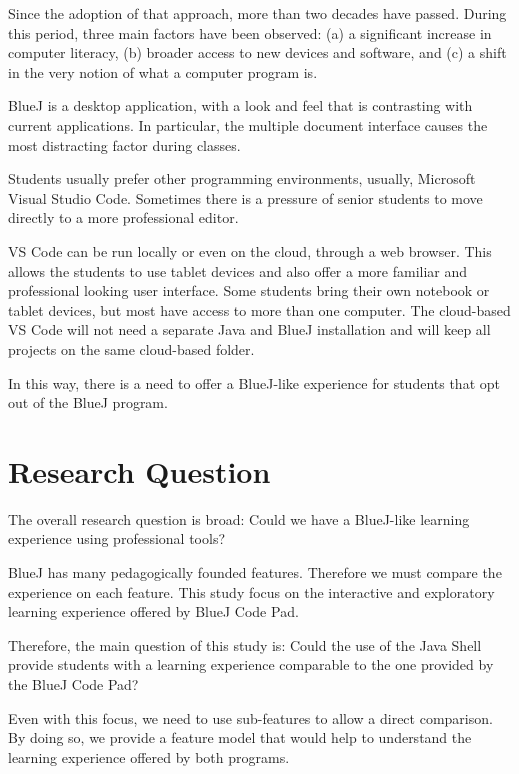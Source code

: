 \documentclass{article}
\begin{document}
Since the adoption of that approach, more than two decades have passed. During this period, three main factors have been observed: (a) a significant increase in computer literacy, (b) broader access to new devices and software, and (c) a shift in the very notion of what a computer program is.

BlueJ is a desktop application, with a look and feel that is contrasting with current applications. In particular, the multiple document interface causes the most distracting factor during classes.

Students usually prefer other programming environments, usually, Microsoft Visual Studio Code. Sometimes there is a pressure of senior students to move directly to a more professional editor. 


VS Code can be run locally or even on the cloud, through a web browser. This allows the students to use tablet devices and also offer a more familiar and professional looking user interface. Some students bring their own notebook or tablet devices, but most have access to more than one computer. The cloud-based VS Code will not need a separate Java and BlueJ installation and will keep all projects on the same cloud-based folder.

In this way, there is a need to offer a BlueJ-like experience for students that opt out of the BlueJ program. 

\section{Research Question}

The overall research question is broad: Could we have a BlueJ-like learning experience using professional tools?

BlueJ has many pedagogically founded features. Therefore we must compare the experience on each feature. This study focus on the interactive and exploratory learning experience offered by BlueJ Code Pad.

Therefore, the main question of this study is:
Could the use of the Java Shell provide students with a learning experience comparable to the one provided by the BlueJ Code Pad?

Even with this focus, we need to use sub-features to allow a direct comparison. By doing so, we provide a feature model that would help to understand the learning experience offered by both programs.
\end{document}
